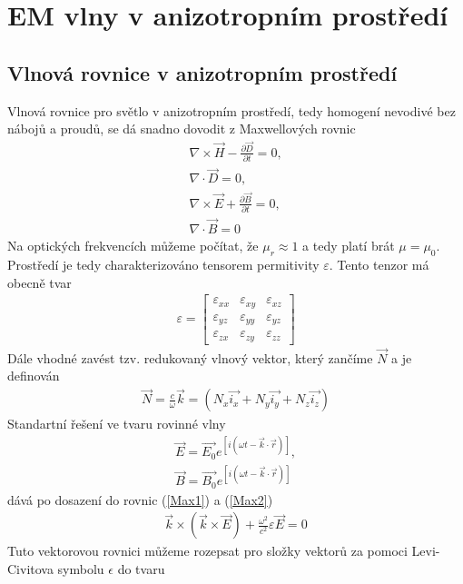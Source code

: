 \chapter{EM vlny v anizotropním prostředí}
\section{Vlnová rovnice v anizotropním prostředí}
Vlnová rovnice pro světlo v anizotropním prostředí, tedy homogení nevodivé bez nábojů a proudů, se dá snadno dovodit z Maxwellových rovnic
\begin{eqnarray}
\nabla \times\vec{H} - \frac{\partial\vec{D}}{\partial t} = 0 , \label{Max1} \\
\nabla \cdot \vec{D} = 0, \label{Max2} \\
\nabla \times \vec{E} + \frac{\partial \vec{B}}{\partial t} = 0, \label{Max3}\\
\nabla\cdot\vec{B}=0 \label{Max4}
\end{eqnarray}
Na optických frekvencích můžeme počítat, že $\mu_r\approx1$ a tedy platí brát $\mu=\mu_0$. Prostředí je tedy charakterizováno tensorem permitivity $\varepsilon$. Tento tenzor má obecně tvar
\begin{eqnarray}
\varepsilon=
\begin{bmatrix}
\varepsilon_{xx} & \varepsilon_{xy} & \varepsilon_{xz} \\
\varepsilon_{yz}& \varepsilon_{yy}& \varepsilon_{yz} \\
\varepsilon_{zx}& \varepsilon_{zy}& \varepsilon_{zz}
\end{bmatrix}
\end{eqnarray}
Dále vhodné zavést tzv. redukovaný vlnový vektor, který zančíme $\vec{N}$ a je definován
\begin{eqnarray}
\vec{N}=\frac{c}{\omega}\vec{k} = (N_x\vec{i_x}+N_y\vec{i_y}+N_z\vec{i_z})
\end{eqnarray}
Standartní řešení ve tvaru rovinné vlny
\begin{eqnarray}
\vec{E} = \vec{E_0}e^{[i(\omega t-\vec{k}\cdot\vec{r})]}, \\
\vec{B} = \vec{B_0}e^{[i(\omega t-\vec{k}\cdot\vec{r})]}
\end{eqnarray}
dává po dosazení do rovnic (\ref{Max1}) a (\ref{Max2})
\begin{eqnarray}
\vec{k}\times(\vec{k}\times\vec{E}) + \frac{\omega^2}{c^2}\varepsilon\vec{E}=0
\end{eqnarray}
Tuto vektorovou rovnici můžeme rozepsat pro složky vektorů za pomoci Levi-Civitova symbolu $\epsilon$ do tvaru
